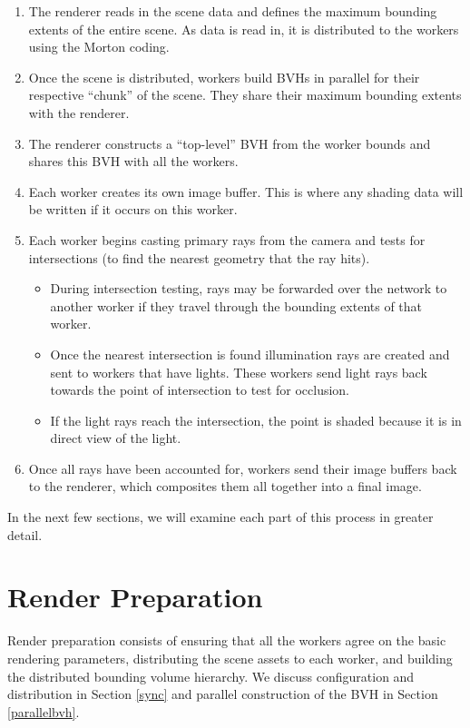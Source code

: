 \documentclass[12pt]{ucthesis}
\begin{document}
\begin{enumerate}
    \item The renderer reads in the scene data and defines the maximum bounding
        extents of the entire scene. As data is read in, it is distributed to
        the workers using the Morton coding.
    \item Once the scene is distributed, workers build BVHs in parallel for
        their respective ``chunk'' of the scene. They share their maximum bounding
        extents with the renderer.
    \item The renderer constructs a ``top-level'' BVH from the worker bounds and
        shares this BVH with all the workers.
    \item Each worker creates its own image buffer. This is where any shading
        data will be written if it occurs on this worker.
    \item Each worker begins casting primary rays from the camera and tests for
        intersections (to find the nearest geometry that the ray hits).
        \begin{itemize}
            \item During intersection testing, rays may be forwarded over the
                network to another worker if they travel through the bounding
                extents of that worker.
            \item Once the nearest intersection is found illumination rays are
                created and sent to workers that have lights. These workers
                send light rays back towards the point of intersection to test
                for occlusion.
            \item If the light rays reach the intersection, the point is shaded
                because it is in direct view of the light.
        \end{itemize}
    \item Once all rays have been accounted for, workers send their image
        buffers back to the renderer, which composites them all together into
        a final image.
\end{enumerate}

In the next few sections, we will examine each part of this process in greater
detail.

\section{Render Preparation}
\label{prep}

Render preparation consists of ensuring that all the workers agree on the
basic rendering parameters, distributing the scene assets to each worker, and
building the distributed bounding volume hierarchy. We discuss configuration
and distribution in Section \ref{sync} and parallel construction of the BVH in
Section \ref{parallelbvh}.
\end{document}

